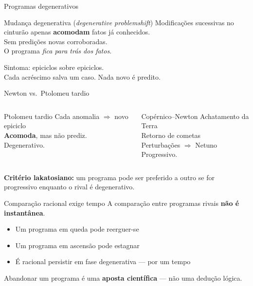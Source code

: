 \documentclass[aspectratio=169]{beamer}
\newcommand{\impt}[1]{\textcolor{maccent}{\textbf{#1}}}
\newcommand{\ntc}[1]{\textcolor{mprimary}{#1}}
\begin{document}
\begin{frame}{Programas degenerativos}
\begin{block}{Mudança degenerativa (\emph{degenerative problemshift})}
Modificações sucessivas no cinturão apenas \impt{acomodam} fatos já conhecidos. \\[0.15cm]
Sem predições novas corroboradas. \\[0.15cm]
O programa \emph{fica para trás dos fatos}.
\end{block}
\pause
\vspace{0.4cm}
\ntc{Sintoma:} epiciclos sobre epiciclos. \\
Cada acréscimo salva um caso. Nada novo é predito.
\end{frame}

\begin{frame}{Newton vs.\ Ptolomeu tardio}
\begin{columns}[t]
\begin{block}{Ptolomeu tardio}
Cada anomalia $\Rightarrow$ novo epiciclo \\[0.15cm]
\impt{Acomoda}, mas não prediz. \\[0.15cm]
\ntc{Degenerativo.}
\end{block}

\pause
\begin{block}{Copérnico--Newton}
Achatamento da Terra \\
Retorno de cometas \\
Perturbações $\Rightarrow$ Netuno \\[0.15cm]
\ntc{Progressivo.}
\end{block}
\end{columns}
\vspace{0.5cm}
\pause
\impt{Critério lakatosiano:} um programa pode ser preferido a outro se for progressivo enquanto o rival é degenerativo.
\end{frame}

\begin{frame}{Comparação racional exige tempo}
A comparação entre programas rivais \impt{não é instantânea}.
\vspace{0.3cm}
\pause
\begin{itemize}
  \item Um programa em queda pode reerguer-se
  \pause
  \item Um programa em ascensão pode estagnar
  \pause
  \item É racional persistir em fase degenerativa --- por um tempo
\end{itemize}
\vspace{0.4cm}
\pause
\begin{alertblock}{}
Abandonar um programa é uma \impt{aposta científica} --- não uma dedução lógica.
\end{alertblock}
\end{frame}
\end{document}
